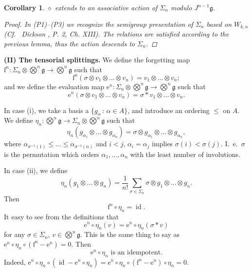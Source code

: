 \documentclass[11pt,a4paper]{amsart}
\newcommand{\plabel}[1]{ \label{#1}}
\newcommand{\plabel}[1]{ \label{#1}\rlap{\smash{${}^{^{[#1]}}$}}}
\newcommand{\plabel}[1]{ \label{#1}}
\DeclareMathOperator{\id}{id}
\newcommand{\botimes}{{\textstyle\bigotimes}}
\theoremstyle{definition}
\theoremstyle{plain}
\newtheorem{cor}[point]{Corollary}
\begin{document}
\begin{cor}
$\diamond$ extends to an associative action of $\Sigma_n$ modulo $J^{n-1}\mathfrak g$.
\begin{proof}
In (P1)--(P3) we recognize the semigroup presentation of $\Sigma_n$ based on $W_{k,n}$ (Cf.~ Dickson \cite{DD}, P. 2, Ch. XIII).
The relations are satisfied according to the previous lemma, thus the action descends to $\Sigma_n$.
\end{proof}
\end{cor}



\textbf{(II) The tensorial splittings.} We define  the forgetting map
 $\mathrm f^n:\Sigma_n\otimes   \botimes^n\mathfrak g \rightarrow \botimes^n\mathfrak g$
 such that
\[\mathrm f^n(\sigma\otimes v_1\otimes\ldots\otimes v_n)=v_1\otimes\ldots\otimes v_n;\]
 and we define the evaluation map
 $\mathrm e^n:\Sigma_n\otimes  \botimes^n\mathfrak g \rightarrow \botimes^n\mathfrak g$
 such that
\[\mathrm e^n(\sigma\otimes v_1\otimes\ldots\otimes v_n)=\sigma*v_1\otimes\ldots\otimes v_n.\]

In case (i), we take a basis a $\{g_\alpha \,:\,\alpha\in A\}$, and introduce an ordering $\leq$ on $A$.
We define  $ \eta_n:\botimes^n\mathfrak g\rightarrow\Sigma_n\otimes  \botimes^n\mathfrak g$ such that
\[\eta_n(g_{\alpha_1}\otimes\ldots \otimes g_{\alpha_n})=\sigma\otimes g_{\alpha_1}\otimes\ldots\otimes g_{\alpha_n},\]
 where $\alpha_{\sigma^{-1}(1)}\leq\ldots\leq\alpha_{\sigma^{-1}(n)}$ and $i< j$, $\alpha_i=\alpha_j$ implies
 $\sigma(i)<\sigma(j)$.
I.~e.~$\sigma$ is the permutation which orders $\alpha_1,\ldots,\alpha_n$ with the least number of involutions.

In case (ii), we define
\[\eta_n(g_{1}\otimes\ldots\otimes g_{n})=\frac1{n!}\sum_{\sigma\in\Sigma_n}\sigma\otimes g_{1}\otimes\ldots \otimes g_{n}.\]
Then
\[\mathrm f^{n}\circ\eta_n=\id.\]
It easy to see from the definitions that
\begin{equation}\mathrm e^{n}\circ\eta_n(v)=\mathrm e^{n}\circ\eta_n(\sigma*v)\plabel{eq:invar}\end{equation}
 for any $\sigma\in\Sigma_n$, $v\in\botimes^{n}\mathfrak g$.
This is the same thing to say  as $\mathrm e^{n}\circ\eta_n\circ(\mathrm f^n-\mathrm e^n)=0$.
Then
\[\mathrm e^{n}\circ\eta_n\text{ is an idempotent}.\]
Indeed, 
 $\mathrm e^{n}\circ\eta_n\circ(\id-\mathrm e^{n}\circ\eta_n)=\mathrm e^{n}\circ\eta_n\circ(\mathrm f^n-\mathrm e^{n})\circ\eta_n=0$.
\end{document}

